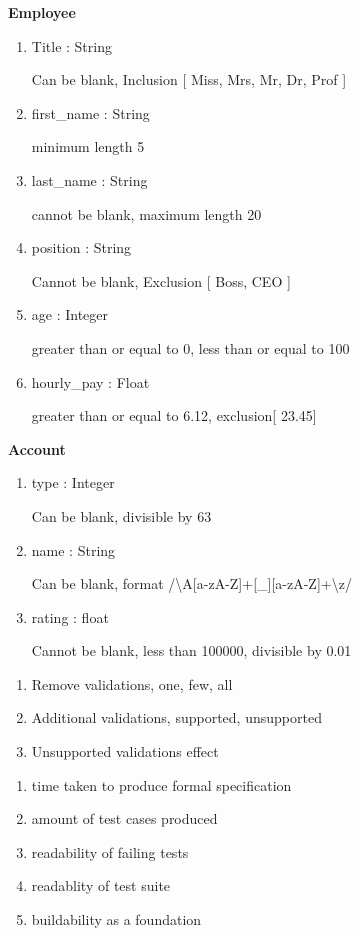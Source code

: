\documentclass[a4paper,12pt]{article}
\begin{document}
\par \textbf{Employee}
\begin{enumerate}
\item Title : String 
\par Can be blank, Inclusion [ Miss, Mrs, Mr, Dr, Prof ]
\item first\_name : String
\par  minimum length 5 
\item last\_name : String
\par cannot be blank, maximum length 20
\item position : String 
\par Cannot be blank, Exclusion [ Boss, CEO ]
\item age : Integer 
\par greater than or equal to 0, less than or equal to 100
\item hourly\_pay : Float 
\par greater than or equal to 6.12, exclusion[ 23.45]
\end{enumerate}

\par \textbf{Account}
\begin{enumerate}
\item type : Integer
\par  Can be blank, divisible by 63
\item name : String
\par Can be blank, format /{\textbackslash}A[a-zA-Z]+[\_][a-zA-Z]+{\textbackslash}z/
\item rating : float 
\par Cannot be blank, less than 100000, divisible by 0.01

\end{enumerate}




\begin{enumerate}
\item Remove validations, one, few, all
\item Additional validations, supported, unsupported
\item Unsupported validations effect
\end{enumerate}

\begin{enumerate}
\item time taken to produce formal specification
\item amount of test cases produced
\item readability of failing tests
\item readablity of test suite
\item buildability as a foundation
\end{enumerate}
\end{document}
